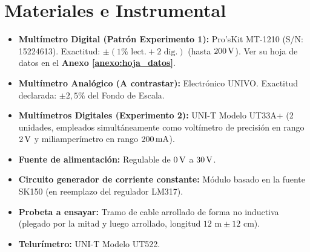 \chapter{Materiales e Instrumental}
\begin{itemize}
    \item \textbf{Multímetro Digital (Patrón Experimento 1):} Pro'sKit MT-1210 (S/N: 15224613). Exactitud: $\pm (1 \percent \text{ lect.} + 2 \text{ dig.})$
        (hasta $200 \,\mathrm{V}$). Ver su hoja de datos en el \textbf{Anexo \ref{anexo:hoja_datos}}.
    \item \textbf{Multímetro Analógico (A contrastar):} Electrónico UNIVO. Exactitud declarada: $\pm 2,5 \percent$ del
        Fondo de Escala.
    \item \textbf{Multímetros Digitales (Experimento 2):} UNI-T Modelo UT33A+ (2 unidades, empleados simultáneamente como voltímetro de precisión en rango $2\,\mathrm{V}$ y miliamperímetro en rango $200\,\mathrm{mA}$).
    \item \textbf{Fuente de alimentación:} Regulable de $0 \,\mathrm{V}$ a $30 \,\mathrm{V}$.
    \item \textbf{Circuito generador de corriente constante:} Módulo basado en la fuente SK150 (en reemplazo del
        regulador LM317).
    \item \textbf{Probeta a ensayar:} Tramo de cable arrollado de forma no inductiva (plegado por la mitad y luego
        arrollado, longitud $12\text{ m} \pm 12\text{ cm}$).
    \item \textbf{Telurímetro:} UNI-T Modelo UT522.
\end{itemize}